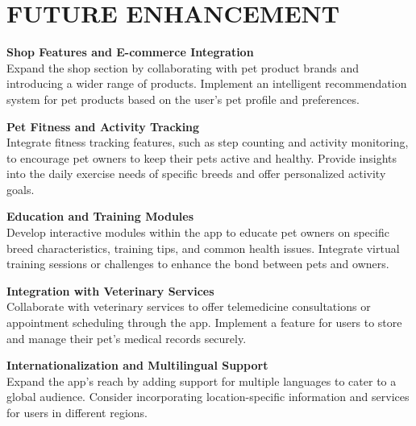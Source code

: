 
\section{FUTURE ENHANCEMENT}
\textbf{Shop Features and E-commerce Integration}\\
Expand the shop section by collaborating with pet product brands and introducing a wider range of products.
Implement an intelligent recommendation system for pet products based on the user's pet profile and preferences.

\noindent\textbf{Pet Fitness and Activity Tracking}\\
Integrate fitness tracking features, such as step counting and activity monitoring, to encourage pet owners to keep their pets active and healthy.
Provide insights into the daily exercise needs of specific breeds and offer personalized activity goals.


\noindent\textbf{Education and Training Modules}\\
Develop interactive modules within the app to educate pet owners on specific breed characteristics, training tips, and common health issues.
Integrate virtual training sessions or challenges to enhance the bond between pets and owners.

\noindent\textbf{Integration with Veterinary Services}\\
Collaborate with veterinary services to offer telemedicine consultations or appointment scheduling through the app.
Implement a feature for users to store and manage their pet's medical records securely.


\noindent\textbf{Internationalization and Multilingual Support}\\
Expand the app's reach by adding support for multiple languages to cater to a global audience.
Consider incorporating location-specific information and services for users in different regions.